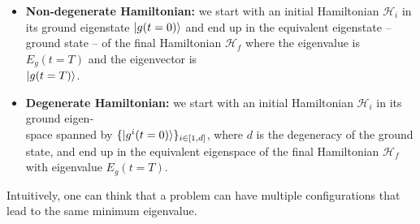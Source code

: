 \begin{itemize}
    \item \textbf{Non-degenerate Hamiltonian:} we start with an initial Hamiltonian $\mathcal{H}_{i}$ in its ground eigenstate $\ket{g(t=0)}$ and end up in the equivalent eigenstate -- ground state -- of the final Hamiltonian $\mathcal{H}_{f}$ where the eigenvalue is $E_{g}(t=T)$ and the eigenvector is\\
    $\ket{g(t=T)}$.
    \item \textbf{Degenerate Hamiltonian:} we start with an initial Hamiltonian $\mathcal{H}_{i}$ in its ground eigen-\\
    space spanned by $\{\ket{g^{i}(t=0)}\}_{i \in \left[1,d\right]}$, where $d$ is the degeneracy of the ground state, and end up in the equivalent eigenspace of the final Hamiltonian $\mathcal{H}_{f}$ with eigenvalue $E_{g}(t=T)$.
\end{itemize}
Intuitively, one can think that a problem can have multiple configurations that lead to the same minimum eigenvalue.
